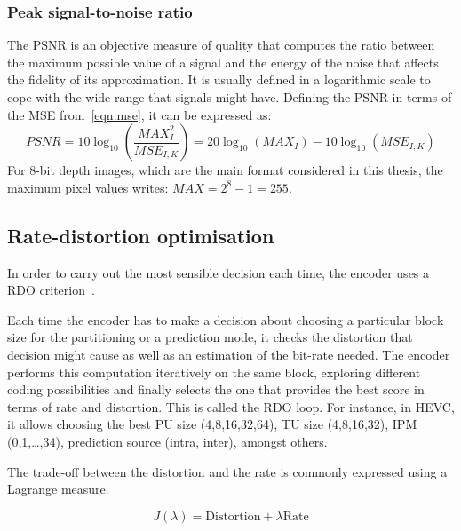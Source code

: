 \documentclass[11pt,a4paper,openright,twoside]{book}
\numberwithin{equation}{section} %
\numberwithin{figure}{section} %
\numberwithin{table}{section} %
\begin{document}
\subsubsection{Peak signal-to-noise ratio}
\label{ssub:peak_signal_to_noise_ratio}

The \ac{PSNR} is an objective measure of quality that computes the ratio
between the maximum possible value of a signal and the energy of the noise
that affects the fidelity of its approximation.
It is usually defined in a logarithmic scale to cope with the wide range that
signals might have.
Defining the \ac{PSNR} in terms of the \ac{MSE} from~\eqref{eqn:mse}, it can
be expressed as:
\begin{equation}
	PSNR = 10 \log_{10} \left(\frac{MAX_I^2}{MSE_{I,K}}\right)
	= 20 \log_{10} (MAX_I) - 10 \log_{10} (MSE_{I,K})
	\label{eqn:psnr}
\end{equation}
For 8-bit depth images, which are the main format considered in this thesis,
the maximum pixel values writes: $MAX = 2^{8} - 1 = 255$.

\subsection{Rate-distortion optimisation}
\label{sub:rate_distortion_optimisation}

In order to carry out the most sensible decision each time, the encoder uses a
\ac{RDO} criterion~\cite{sullivan-98-rdo-video-compression}.

Each time the encoder has to make a decision about choosing a
particular block size for the partitioning or a prediction mode, it
checks the distortion that decision might cause as well as an estimation
of the bit-rate needed.
The encoder performs this computation iteratively on the same block,
exploring different coding possibilities and finally selects the one that
provides the best score in terms of rate and distortion.  This is called the
\ac{RDO} loop.
For instance, in \ac{HEVC}, it allows choosing the best \ac{PU} size
(4,8,16,32,64), \ac{TU} size (4,8,16,32), \ac{IPM} (0,1,\ldots,34), prediction
source (intra, inter), amongst others.

The trade-off between the distortion and the rate is commonly expressed
using a Lagrange measure.

\begin{equation}
	J(\lambda) = \text{Distortion} + \lambda \text{Rate}
	\label{eqn:lagrangian_rdo}
\end{equation}
\end{document}
